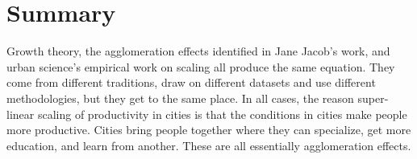 


\section{Summary}

Growth theory, the agglomeration effects identified in Jane Jacob's work, and urban science's empirical work on scaling all produce the same equation. They come from different traditions, draw on different datasets and use different methodologies, but they get to the same place. 
In all cases, the reason super-linear scaling of productivity in cities is that the conditions in cities make people more productive. %
Cities bring people together where they can specialize, get more education, and learn from another. These are all essentially agglomeration effects. 

